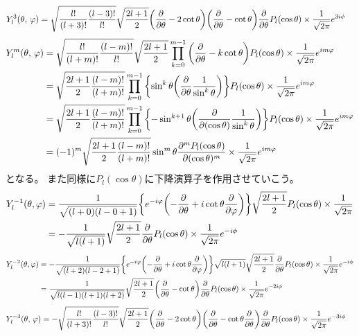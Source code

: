 \documentclass[../../master.tex]{subfiles}
\begin{document}
\begin{align}
	Y_l^3(\theta,\,\varphi)
	 & =\sqrt{\frac{l!}{(l+3)!}\frac{(l-3)!}{l!}}\sqrt{\frac{2l+1}{2}}\qty(\pdv{\theta}-2\cot\theta)\qty(\pdv{\theta}-\cot\theta)\pdv{\theta}P_l(\cos\theta)\times\frac{1}{\sqrt{2\pi}}e^{3i\phi}
\end{align}
\begin{align}
	Y_l^m(\theta,\,\varphi)
	 & =\sqrt{\frac{l!}{(l+m)!}\frac{(l-m)!}{l!}}\sqrt{\frac{2l+1}{2}} \prod_{k=0}^{m-1}\qty(\pdv{\theta}-k\cot\theta)P_l(\cos\theta)\times\frac{1}{\sqrt{2\pi}}e^{im\varphi}                    \\
	 & =\sqrt{\frac{2l+1}{2}\frac{(l-m)!}{(l+m)!}} \prod_{k=0}^{m-1}\qty{\sin^k\theta\qty(\pdv{\theta}\frac{1}{\sin^k\theta})}P_l(\cos\theta)\times\frac{1}{\sqrt{2\pi}}e^{im\varphi}            \\
	 & =\sqrt{\frac{2l+1}{2}\frac{(l-m)!}{(l+m)!}} \prod_{k=0}^{m-1}\qty{-\sin^{k+1}\theta\qty(\pdv{(\cos\theta)}\frac{1}{\sin^k\theta})}P_l(\cos\theta)\times\frac{1}{\sqrt{2\pi}}e^{im\varphi} \\
	 & =(-1)^m\sqrt{\frac{2l+1}{2}\frac{(l-m)!}{(l+m)!}} \sin^{m}\theta\pdv[m]{P_l(\cos\theta)}{(\cos\theta)}\times\frac{1}{\sqrt{2\pi}}e^{im\varphi}
\end{align}
となる。
また同様に\(P_l(\cos\theta)\)に下降演算子を作用させていこう。
\begin{align}
	Y_l^{-1}(\theta,\varphi)
	 & = \frac{1}{\sqrt{(l+0)(l-0+1)}}\qty{e^{-i\varphi}\qty(-\pdv{\theta}+i\cot\theta\pdv{\varphi})}\sqrt{\frac{2l+1}{2}}P_l(\cos\theta)\times\frac{1}{\sqrt{2\pi}} \\
	 & =	-\frac{1}{\sqrt{l(l+1)}}\sqrt{\frac{2l+1}{2}}\pdv{\theta}P_l(\cos\theta)\times\frac{1}{\sqrt{2\pi}}e^{-i\phi}
\end{align}
\begin{align}
	Y_l^{-2}(\theta,\varphi)
	 & =-\frac{1}{\sqrt{(l+2)(l-2+1)}}\qty{e^{-i\varphi}\qty(-\pdv{\theta}+i\cot\theta\pdv{\varphi})}\sqrt{l(l+1)}\sqrt{\frac{2l+1}{2}}\pdv{\theta}P_l(\cos\theta)\times\frac{1}{\sqrt{2\pi}}e^{-i\phi} \\
	 & =\frac{1}{\sqrt{l(l-1)(l+1)(l+2)}}\sqrt{\frac{2l+1}{2}}\qty(\pdv{\theta}-\cot\theta)\pdv{\theta}P_l(\cos\theta)\times\frac{1}{\sqrt{2\pi}}e^{-2i\phi}
\end{align}
\begin{align}
	Y_l^{-3}(\theta,\,\varphi)
	 & =-\sqrt{\frac{l!}{(l+3)!}\frac{(l-3)!}{l!}}\sqrt{\frac{2l+1}{2}}\qty(\pdv{\theta}-2\cot\theta)\qty(\pdv{\theta}-\cot\theta\pdv{\theta})\pdv{\theta}P_l(\cos\theta)\times\frac{1}{\sqrt{2\pi}}e^{-3i\phi}
\end{align}
\end{document}
